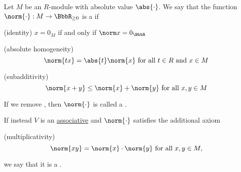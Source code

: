 \begin{definition}\label{def:norm}
  Let \( M \) be an \( R \)-module with absolute value \( \abs{\cdot} \). We say that the function \( \norm{\cdot}: M \to \BbbR_{\geq 0} \) is a  if
  \begin{thmenum}
    (identity) \( x = 0_M \) if and only if \( \norm x = 0_{\BbbR} \)

    (absolute homogeneity)
    \begin{equation*}
      \norm{t x} = \abs{t} \norm{x} \text{ for all } t \in R \text{ and } x \in M
    \end{equation*}

    (subadditivity)
    \begin{equation*}
      \norm{x + y} \leq \norm{x} + \norm{y} \text{ for all } x, y \in M
    \end{equation*}
  \end{thmenum}

  If we remove , then \( \norm{\cdot} \) is called a .

  If instead \( V \) is an \hyperref[def:algebra_over_semiring]{associative} and \( \norm{\cdot} \) satisfies the additional axiom
  \begin{thmenum}
    (multiplicativity)
    \begin{equation*}
      \norm{xy} = \norm{x} \cdot \norm{y} \text{ for all } x, y \in M,
    \end{equation*}
  \end{thmenum}
  we say that it is a .
\end{definition}

\begin{definition}\label{def:normed_vector}
\end{definition}

